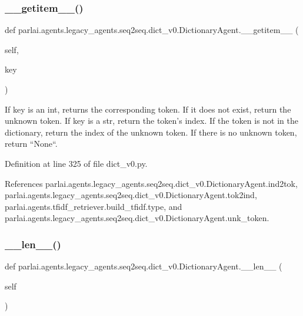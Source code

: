 \subsubsection{\texorpdfstring{\+\_\+\+\_\+getitem\+\_\+\+\_\+()}{\_\_getitem\_\_()}}
{\footnotesize\ttfamily def parlai.\+agents.\+legacy\+\_\+agents.\+seq2seq.\+dict\+\_\+v0.\+Dictionary\+Agent.\+\_\+\+\_\+getitem\+\_\+\+\_\+ (\begin{DoxyParamCaption}\item[{}]{self,  }\item[{}]{key }\end{DoxyParamCaption})}

\begin{DoxyVerb}If key is an int, returns the corresponding token. If it does not
exist, return the unknown token.
If key is a str, return the token's index. If the token is not in the
dictionary, return the index of the unknown token. If there is no
unknown token, return ``None``.
\end{DoxyVerb}
 

Definition at line 325 of file dict\+\_\+v0.\+py.



References parlai.\+agents.\+legacy\+\_\+agents.\+seq2seq.\+dict\+\_\+v0.\+Dictionary\+Agent.\+ind2tok, parlai.\+agents.\+legacy\+\_\+agents.\+seq2seq.\+dict\+\_\+v0.\+Dictionary\+Agent.\+tok2ind, parlai.\+agents.\+tfidf\+\_\+retriever.\+build\+\_\+tfidf.\+type, and parlai.\+agents.\+legacy\+\_\+agents.\+seq2seq.\+dict\+\_\+v0.\+Dictionary\+Agent.\+unk\+\_\+token.

\mbox{\label{classparlai_1_1agents_1_1legacy__agents_1_1seq2seq_1_1dict__v0_1_1DictionaryAgent_a7cf7b736b38ff48f666e0b713328d568}} 
\subsubsection{\texorpdfstring{\+\_\+\+\_\+len\+\_\+\+\_\+()}{\_\_len\_\_()}}
{\footnotesize\ttfamily def parlai.\+agents.\+legacy\+\_\+agents.\+seq2seq.\+dict\+\_\+v0.\+Dictionary\+Agent.\+\_\+\+\_\+len\+\_\+\+\_\+ (\begin{DoxyParamCaption}\item[{}]{self }\end{DoxyParamCaption})}




